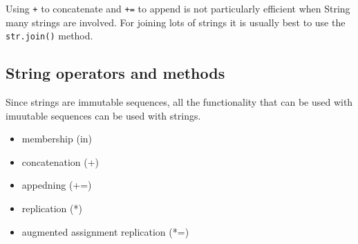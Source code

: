 Using \verb|+| to concatenate and \verb|+=| to append is not particularly efficient when String
many strings are involved.
For joining lots of strings it is usually best to use the \verb|str.join()| method.



\subsection{String operators and methods}

Since strings are immutable sequences, all the functionality that can be used with imuutable sequences can be used with strings.

\begin{itemize}
\item membership (in)
\item concatenation (+)
\item appedning (+=)
\item replication (*)
\item augmented assignment replication (*=)
\end{itemize}


